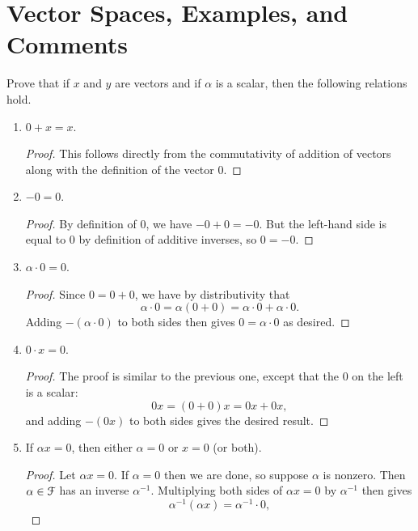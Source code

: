 \section{Vector Spaces, Examples, and Comments}

 Prove that if $x$ and $y$ are vectors and if $\alpha$ is a
scalar, then the following relations hold.
\label{exercise:spaces:vspace-properties}
\begin{enumerate}
\item $0 + x = x$.
  \begin{proof}
    This follows directly from the commutativity of addition of
    vectors along with the definition of the vector $0$.
  \end{proof}
\item $-0 = 0$.
  \begin{proof}
    By definition of $0$, we have $-0 + 0 = -0$. But the left-hand
    side is equal to $0$ by definition of additive inverses, so
    $0 = -0$.
  \end{proof}
\item $\alpha\cdot0 = 0$.
  \begin{proof}
    Since $0 = 0 + 0$, we have by distributivity that
    \begin{equation*}
      \alpha\cdot0 = \alpha(0 + 0) = \alpha\cdot0 + \alpha\cdot0.
    \end{equation*}
    Adding $-(\alpha\cdot0)$ to both sides then gives
    $0 = \alpha\cdot0$ as desired.
  \end{proof}
\item $0\cdot x = 0$.
  \begin{proof}
    The proof is similar to the previous one, except that the $0$ on
    the left is a scalar:
    \begin{equation*}
      0x = (0 + 0)x = 0x + 0x,
    \end{equation*}
    and adding $-(0x)$ to both sides gives the desired result.
  \end{proof}
\item If $\alpha x = 0$, then either $\alpha = 0$ or $x = 0$ (or
  both).
  \begin{proof}
    Let $\alpha x = 0$. If $\alpha = 0$ then we are done, so suppose
    $\alpha$ is nonzero. Then $\alpha\in\mathcal{F}$ has an inverse
    $\alpha^{-1}$. Multiplying both sides of $\alpha x = 0$ by
    $\alpha^{-1}$ then gives
    \begin{equation*}
      \alpha^{-1}(\alpha x) = \alpha^{-1}\cdot0,
    \end{equation*}

\end{proof}
\end{enumerate}
